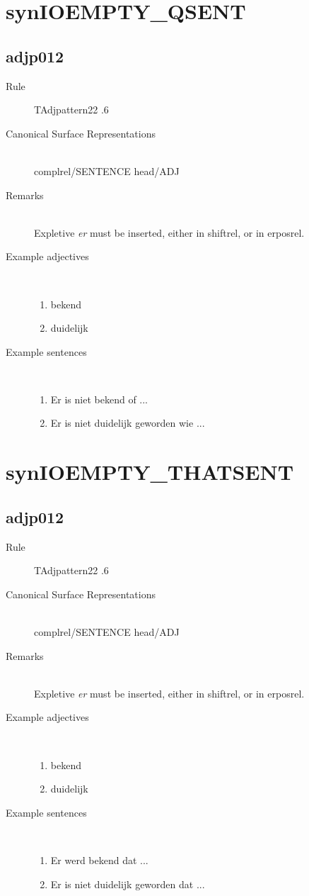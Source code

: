\section{synIOEMPTY\_QSENT}
  \subsection{adjp012}
\begin{description}
  \item [Rule] TAdjpattern22 .6
  \item [Canonical Surface Representations]  \mbox{}\\ 
complrel/SENTENCE head/ADJ
  \item [Remarks] \mbox{}\\
Expletive {\em er} must be inserted, either in shiftrel, or in erposrel.
  \item [Example adjectives]\mbox{}\\
\begin{enumerate}
  \item bekend
  \item duidelijk
\end{enumerate}
  \item [Example sentences]\mbox{}\\
\begin{enumerate}
  \item Er is niet bekend of ...
  \item Er is niet duidelijk geworden wie ...
\end{enumerate}
\end{description}
\newpage
\section{synIOEMPTY\_THATSENT}
  \subsection{adjp012}
\begin{description}
  \item [Rule] TAdjpattern22 .6
  \item [Canonical Surface Representations]  \mbox{}\\ 
complrel/SENTENCE head/ADJ
  \item [Remarks] \mbox{}\\
Expletive {\em er} must be inserted, either in shiftrel, or in erposrel.
  \item [Example adjectives]\mbox{}\\
\begin{enumerate}
  \item bekend
  \item duidelijk
\end{enumerate}
  \item [Example sentences]\mbox{}\\
\begin{enumerate}
  \item Er werd bekend dat ... 
  \item Er is niet duidelijk geworden dat ...
\end{enumerate}
\end{description}

